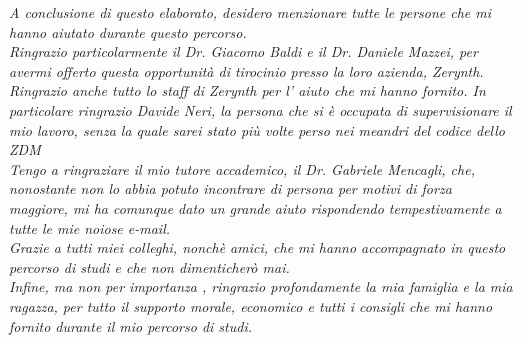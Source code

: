 \documentclass[a4paper,12pt,titlepage,italian,openany]{report}
\begin{document}
\textit{A conclusione di questo elaborato, desidero menzionare tutte le persone che mi hanno aiutato durante questo percorso.}\\[12pt]
\textit{Ringrazio particolarmente il Dr. Giacomo Baldi e il Dr. Daniele Mazzei, per avermi offerto questa opportunità di tirocinio presso la loro azienda, Zerynth.}\\[12pt]
\textit{Ringrazio anche tutto lo staff di Zerynth per l' aiuto che mi hanno fornito. In particolare ringrazio Davide Neri, la persona che si è occupata di supervisionare il mio lavoro, senza la quale sarei stato più volte perso nei meandri del codice dello ZDM}\\[12pt]
\textit{Tengo a ringraziare il mio tutore accademico, il Dr. Gabriele Mencagli, che, nonostante non lo abbia potuto incontrare di persona per motivi di forza maggiore, mi ha comunque dato un grande aiuto rispondendo tempestivamente a tutte le mie noiose e-mail.}\\[12pt]
\textit{Grazie a tutti miei colleghi, nonchè amici, che mi hanno accompagnato in questo percorso di studi e che non dimenticherò mai.}\\[12pt]
\textit{Infine, ma non per importanza , ringrazio profondamente la mia famiglia e la mia ragazza, per tutto il supporto morale, economico e tutti i consigli che mi hanno fornito durante il mio percorso di studi.}
\end{document}
